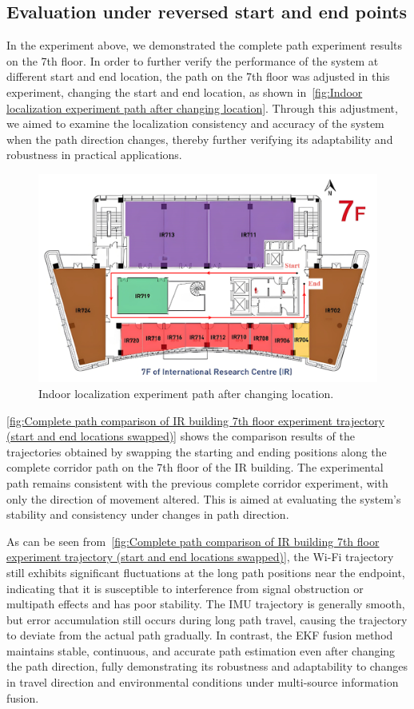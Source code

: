 \documentclass[12pt,a4paper]{article}
\numberwithin{equation}{section}
\begin{document}
\subsection{Evaluation under reversed start and end points}
In the experiment above, we demonstrated the complete path experiment results on
the 7th floor. In order to further verify the performance of the system at
different start and end location, the path on the 7th floor was adjusted in this
experiment, changing the start and end location, as shown in~\autoref{fig:Indoor
  localization experiment path after changing location}. Through this
adjustment, we aimed to examine the localization consistency and accuracy of the
system when the path direction changes, thereby further verifying its
adaptability and robustness in practical applications.
\begin{figure}[H]
  \centering
  \includegraphics[width=0.9\linewidth]{images/ir_full_circle_inverse.png}
  \caption{Indoor localization experiment path after changing location.}
  \label{fig:Indoor localization experiment path after changing location}
\end{figure}

\autoref{fig:Complete path comparison of IR building 7th floor experiment
  trajectory (start and end locations swapped)} shows the comparison results of
the trajectories obtained by swapping the starting and ending positions along
the complete corridor path on the 7th floor of the IR building. The experimental
path remains consistent with the previous complete corridor experiment, with
only the direction of movement altered. This is aimed at evaluating the system's
stability and consistency under changes in path direction.

As can be seen from~\autoref{fig:Complete path comparison of IR building 7th
  floor experiment trajectory (start and end locations swapped)}, the Wi-Fi
trajectory still exhibits significant fluctuations at the long path positions
near the endpoint, indicating that it is susceptible to interference from signal
obstruction or multipath effects and has poor stability. The IMU trajectory is
generally smooth, but error accumulation still occurs during long path travel,
causing the trajectory to deviate from the actual path gradually. In contrast,
the EKF fusion method maintains stable, continuous, and accurate path estimation
even after changing the path direction, fully demonstrating its robustness and
adaptability to changes in travel direction and environmental conditions under
multi-source information fusion.
\end{document}
